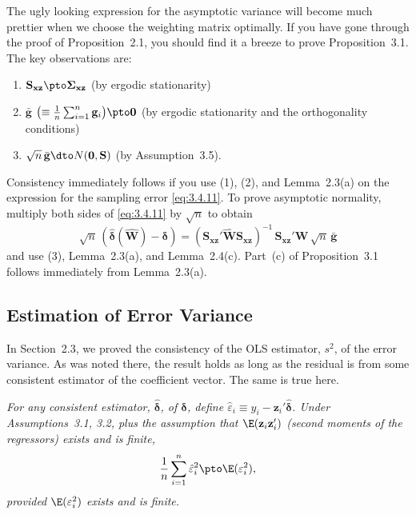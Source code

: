 The ugly looking expression for the asymptotic variance will become much prettier
when we choose the weighting matrix optimally.  If you have gone through the
proof of Proposition~2.1, you should find it a breeze to prove Proposition~3.1.  The
key observations are:

\begin{enumerate}
\item[(1)] $\mathbf{S}_{\mathbf{xz}} \pto \boldsymbol{\Sigma}_{\mathbf{xz}}$
  \quad (by ergodic stationarity)

\item[(2)] $\bar{\mathbf{g}}$
  $\bigl(\equiv \frac{1}{n} \sum_{i=1}^{n} \mathbf{g}_i\bigr) \pto \mathbf{0}$
  \quad (by ergodic stationarity and the orthogonality conditions)

\item[(3)] $\sqrt{n}\, \bar{\mathbf{g}} \dto N(\mathbf{0}, \mathbf{S})$
  \quad (by Assumption~3.5).
\end{enumerate}

Consistency immediately follows if you use (1), (2), and Lemma~2.3(a) on the
expression for the sampling error \eqref{eq:3.4.11}.  To prove asymptotic normality, multiply
both sides of \eqref{eq:3.4.11} by $\sqrt{n}$ to obtain
\begin{equation}
  \sqrt{n}\,(\hat{\boldsymbol{\delta}}(\hat{\mathbf{W}}) - \boldsymbol{\delta})
  = (\mathbf{S}_{\mathbf{xz}}' \hat{\mathbf{W}} \mathbf{S}_{\mathbf{xz}})^{-1}\,
    \mathbf{S}_{\mathbf{xz}}' \hat{\mathbf{W}}\, \sqrt{n}\, \bar{\mathbf{g}}
  \label{eq:3.5.3}
\end{equation}
and use (3), Lemma~2.3(a), and Lemma~2.4(c).  Part~(c) of Proposition~3.1 follows
immediately from Lemma~2.3(a).

\subsection*{Estimation of Error Variance}

In Section~2.3, we proved the consistency of the OLS estimator, $s^2$, of the error
variance.  As was noted there, the result holds as long as the residual is from some
consistent estimator of the coefficient vector.  The same is true here.

\begin{proposition}
\label{prop:3.2}
\emph{For any consistent estimator, $\hat{\boldsymbol{\delta}}$, of $\boldsymbol{\delta}$, define
$\hat{\varepsilon}_i \equiv y_i - \mathbf{z}_i' \hat{\boldsymbol{\delta}}$.  Under Assumptions~3.1, 3.2,
plus the assumption that $\E(\mathbf{z}_i \mathbf{z}_i')$ (second moments of the regressors) exists
and is finite,}
\[
  \frac{1}{n} \sum_{i=1}^{n} \hat{\varepsilon}_i^2 \pto \E(\varepsilon_i^2),
\]
\emph{provided $\E(\varepsilon_i^2)$ exists and is finite.}
\end{proposition}

